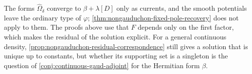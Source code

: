 The forms $\widehat\Omega_\delta$ converge to $\beta+\lambda[D]$ only as currents, and the smooth potentials leave the ordinary type of $\varphi$; \cref{thm:nongauduchon-fixed-pole-recovery} does not apply to them. The proofs above use that $F$ depends only on the first factor, which makes the residual of the solution explicit. For a general continuous density, \cref{prop:nongauduchon-residual-correspondence} still gives a solution that is unique up to constants, but whether its supporting set is a singleton is the question of \cref{conj:continuous-gaud-adjoint} for the Hermitian form $\beta$.
